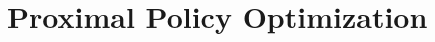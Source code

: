 \documentclass[aspectratio=169]{beamer}
\begin{document}

\section{Proximal Policy Optimization}
\end{document}

